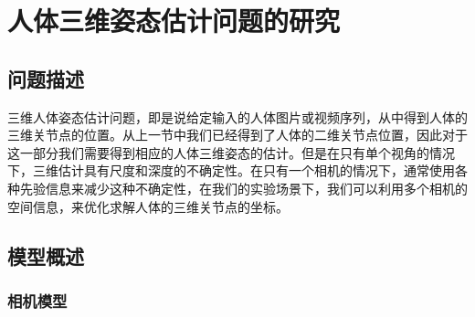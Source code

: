 
\section{人体三维姿态估计问题的研究}
\subsection{问题描述}
三维人体姿态估计问题，即是说给定输入的人体图片或视频序列，从中得到人体的三维关节点的位置。从上一节中我们已经得到了人体的二维关节点位置，因此对于这一部分我们需要得到相应的人体三维姿态的估计。但是在只有单个视角的情况下，三维估计具有尺度和深度的不确定性。在只有一个相机的情况下，通常使用各种先验信息来减少这种不确定性，在我们的实验场景下，我们可以利用多个相机的空间信息，来优化求解人体的三维关节点的坐标。

\subsection{模型概述}
\subsubsection{相机模型}


